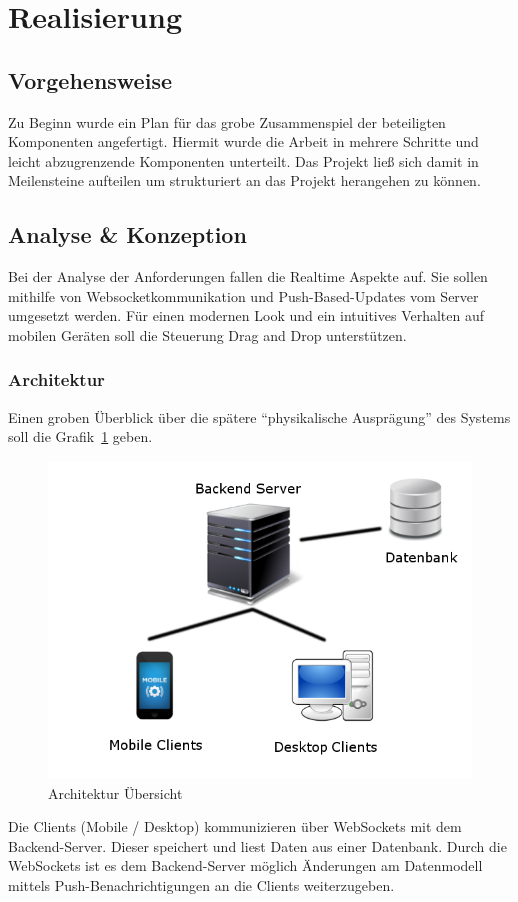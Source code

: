 \section{Realisierung}
\subsection{Vorgehensweise}
Zu Beginn wurde ein Plan für das grobe Zusammenspiel der beteiligten
Komponenten angefertigt. Hiermit wurde die Arbeit in mehrere Schritte
und leicht abzugrenzende Komponenten unterteilt. Das Projekt ließ sich
damit in Meilensteine aufteilen um strukturiert an das Projekt
herangehen zu können.
\subsection{Analyse \& Konzeption}
Bei der Analyse der Anforderungen fallen die Realtime Aspekte auf. Sie
sollen mithilfe von Websocketkommunikation und Push-Based-Updates vom
Server umgesetzt werden. Für einen modernen Look und ein intuitives
Verhalten auf mobilen Geräten soll die Steuerung Drag and Drop unterstützen.
\subsubsection*{Architektur}
Einen groben Überblick über die spätere ``physikalische Ausprägung''
des Systems soll die Grafik~\ref{fig:architektur} geben.
\begin{figure}[h]
\includegraphics[scale=0.5]{img/Architektur.png}
\caption{Architektur Übersicht\label{fig:architektur}}
\end{figure}
Die Clients (Mobile / Desktop) kommunizieren über WebSockets mit dem
Backend-Server. Dieser speichert und liest Daten aus einer Datenbank.
Durch die WebSockets ist es dem Backend-Server möglich Änderungen am
Datenmodell mittels Push-Benachrichtigungen an die Clients weiterzugeben.
